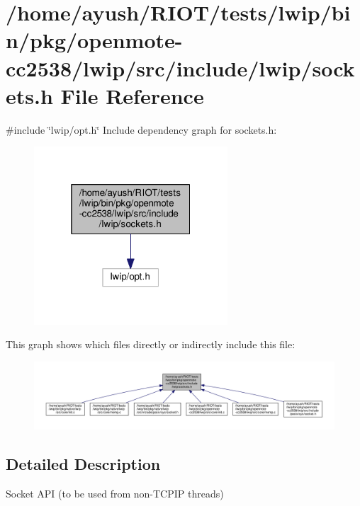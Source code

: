 \hypertarget{openmote-cc2538_2lwip_2src_2include_2lwip_2sockets_8h}{}\section{/home/ayush/\+R\+I\+O\+T/tests/lwip/bin/pkg/openmote-\/cc2538/lwip/src/include/lwip/sockets.h File Reference}
\label{openmote-cc2538_2lwip_2src_2include_2lwip_2sockets_8h}
{\ttfamily \#include \char`\"{}lwip/opt.\+h\char`\"{}}\newline
Include dependency graph for sockets.\+h\+:
\nopagebreak
\begin{figure}[H]
\begin{center}
\leavevmode
\includegraphics[width=205pt]{openmote-cc2538_2lwip_2src_2include_2lwip_2sockets_8h__incl}
\end{center}
\end{figure}
This graph shows which files directly or indirectly include this file\+:
\nopagebreak
\begin{figure}[H]
\begin{center}
\leavevmode
\includegraphics[width=350pt]{openmote-cc2538_2lwip_2src_2include_2lwip_2sockets_8h__dep__incl}
\end{center}
\end{figure}


\subsection{Detailed Description}
Socket A\+PI (to be used from non-\/\+T\+C\+P\+IP threads) 